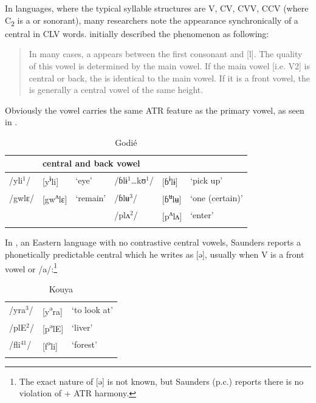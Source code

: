 \documentclass[output=paper,newtxmath,modfonts,nonflat,draft]{langsci/langscibook}
\begin{document}
In  languages, where the typical syllable structures are V, CV, CVV, CCV (where C\textsubscript{2} is a  or sonorant), many researchers note the appearance synchronically of a central  in CLV words.  \citet[98]{Marchese1979/1983} initially described the phenomenon as following:  
\begin{quote}
In many cases, a  appears between the first consonant and [l]. The quality of this vowel is determined by the main vowel.  If the main vowel [i.e. V2] is central or back, the  is identical to the main vowel.  If it is a front vowel, the  is generally a central vowel of the same height. 
\end{quote}

Obviously the vowel carries the same ATR feature as the primary vowel, as seen in .

\begin{table}
\caption{Godié}
\label{tab:zogbo:20}
\begin{tabular}{llllll}
\lsptoprule
\multicolumn{3}{l}{front vowel} & \multicolumn{3}{l}{central and back vowel}\\
\midrule
/yli$^1$/  & [y\textsuperscript{ɨ}li]  &  ‘eye’  &  /ɓlɨ$^1$…kʊ$^1$/ & [ɓ\textsuperscript{ɨ}lɨ] & ‘pick up’\\

/gwlɛ/ & [gw\textsuperscript{ʌ}lɛ] & ‘remain’ & /ɓlʉ$^3$/  &  [ɓ\textsuperscript{ʉ}lʉ]  & ‘one (certain)’\\

&&& /plʌ$^2$/  &  [p\textsuperscript{ʌ}lʌ]  & ‘enter’\\
\lspbottomrule
\end{tabular} 
\end{table}

In , an Eastern language with no contrastive central vowels, Saunders reports a phonetically predictable central  which he writes as [ə], {usually when V is a front vowel or /a/}:\footnote{The exact nature of [ə] is not known, but Saunders (p.c.) reports there is no violation of + ATR harmony.}

\begin{table}
\caption{Kouya \citep{Saunders2009}}
\label{tab:zogbo:21}
	\begin{tabular}{p{1.5cm}ll}
\lsptoprule
{/yra}{$^3$}{/} &   {[y}{\textsuperscript{ə}}{ra]} & {‘to look at’}\\

{/plE}{$^2$}{/}  &  {[p}{\textsuperscript{ə}}{lE]} & {‘liver’} \\

{/fli}{$^{41}$}{/}  &  {[f}{\textsuperscript{ə}}{li]} & {‘forest’} \\
\lspbottomrule
	\end{tabular}
\end{table}
\end{document}
